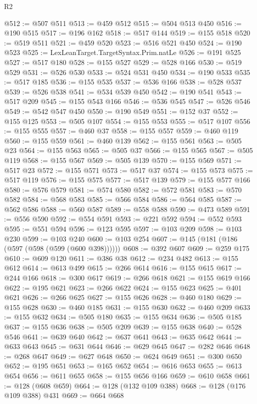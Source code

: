 \begin{lexlean}{R2}
\begin{coremodule}
@512 := @507 @511
@513 := @459 @512
@515 := @504 @513 @450
@516 := @190 @515
@517 := @196 @162
@518 := @517 @144
@519 := @155 @518
@520 := @519 @511
@521 := @459 @520
@523 := @516 @521 @450
@524 := @190 @523
@525 := LexLeanTarget.TargetSyntax.Prim.natLe
@526 := @191 @525
@527 := @517 @180
@528 := @155 @527
@529 := @528 @166
@530 := @519 @529
@531 := @526 @530
@533 := @524 @531 @450
@534 := @190 @533
@535 := @517 @185
@536 := @155 @535
@537 := @536 @166
@538 := @528 @537
@539 := @526 @538
@541 := @534 @539 @450
@542 := @190 @541
@543 := @517 @209
@545 := @155 @543 @166
@546 := @536 @545
@547 := @526 @546
@549 := @542 @547 @450
@550 := @190 @549
@551 := @152 @37
@552 := @155 @125
@553 := @505 @107
@554 := @155 @553
@555 := @517 @107
@556 := @155 @555
@557 := @460 @37
@558 := @155 @557
@559 := @460 @119
@560 := @155 @559
@561 := @460 @139
@562 := @155 @561
@563 := @505 @23
@564 := @155 @563
@565 := @505 @37
@566 := @155 @565
@567 := @505 @119
@568 := @155 @567
@569 := @505 @139
@570 := @155 @569
@571 := @517 @23
@572 := @155 @571
@573 := @517 @37
@574 := @155 @573
@575 := @517 @119
@576 := @155 @575
@577 := @517 @139
@579 := @155 @577 @166
@580 := @576 @579
@581 := @574 @580
@582 := @572 @581
@583 := @570 @582
@584 := @568 @583
@585 := @566 @584
@586 := @564 @585
@587 := @562 @586
@588 := @560 @587
@589 := @558 @588
@590 := @473 @589
@591 := @556 @590
@592 := @554 @591
@593 := @221 @592
@594 := @552 @593
@595 := @551 @594
@596 := @123 @595
@597 := @103 @209
@598 := @103 @230
@599 := @103 @240
@600 := @103 @254
@607 := @145 (@181 (@186 (@597 (@598 (@599 (@600 @398))))))
@608 := @392 @607
@609 := @259 @175
@610 := @609 @120
@611 := @386 @38
@612 := @234 @482
@613 := @155 @612
@614 := @613 @499
@615 := @266 @614
@616 := @155 @615
@617 := @244 @166
@618 := @300 @617
@619 := @266 @618
@621 := @155 @619 @166
@622 := @195 @621
@623 := @266 @622
@624 := @155 @623
@625 := @401 @621
@626 := @266 @625
@627 := @155 @626
@628 := @460 @180
@629 := @155 @628
@630 := @460 @185
@631 := @155 @630
@632 := @460 @209
@633 := @155 @632
@634 := @505 @180
@635 := @155 @634
@636 := @505 @185
@637 := @155 @636
@638 := @505 @209
@639 := @155 @638
@640 := @528 @546
@641 := @639 @640
@642 := @637 @641
@643 := @635 @642
@644 := @633 @643
@645 := @631 @644
@646 := @629 @645
@647 := @282 @646
@648 := @268 @647
@649 := @627 @648
@650 := @624 @649
@651 := @300 @650
@652 := @195 @651
@653 := @165 @652
@654 := @616 @653
@655 := @613 @654
@656 := @611 @655
@658 := @155 @656 @166
@659 := @610 @658
@661 := @128 (@608 @659)
@664 := @128 (@132 @109 @388)
@668 := @128 (@176 @109 @388) @431
@669 := @664 @668

\end{coremodule}
\end{lexlean}
